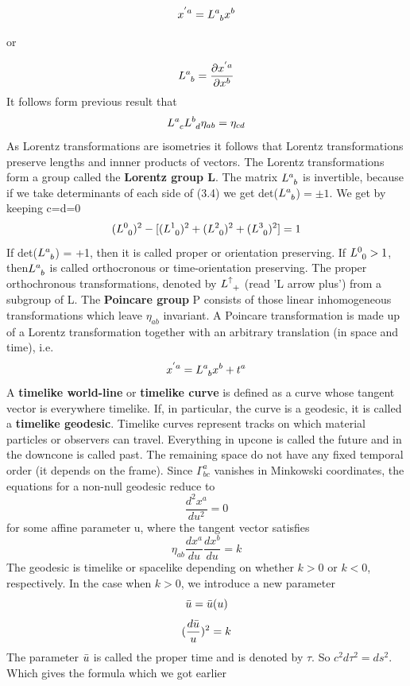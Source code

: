 \documentclass[12pt,a4paper]{article}
\numberwithin{table}{section}
\numberwithin{figure}{section}
\numberwithin{equation}{section}
\theoremstyle{remark}
\theoremstyle{definition}
\begin{document}
\begin{equation}
    x^{'a}=\tensor{L}{^a_b}x^b
\end{equation}

or

$$\tensor{L}{^a_b}=\dfrac{\partial x^{'a}}{\partial x^b} $$
It follows form previous result that
\begin{equation}
  \tensor{L}{^a_c}\tensor{L}{^b_d}\eta_{ab}=\eta_{cd}  
\end{equation}
As Lorentz transformations are isometries it follows that Lorentz 
transformations preserve lengths and innner products of vectors. The Lorentz 
transformations form a group called the \textbf{Lorentz group L}.
The matrix $\tensor{L}{^a_b}$ is invertible, because if we take determinants of each side of (3.4) we get det($\tensor{L}{^a_b} $)$=\pm1$. We get by keeping c=d=0
$$(\tensor{L}{^0_0})^2-[(\tensor{L}{^1_0})^2+(\tensor{L}{^2_0})^2+(\tensor{L}{^3_0})^2]=1 $$
If det($\tensor{L}{^a_b}$) = +1, then it is called proper or orientation preserving.
If $\tensor{L}{^0_0} > 1$, then$\tensor{L}{^a_b} $ is called orthocronous or 
time-orientation preserving.
The proper orthochronous transformations, denoted by $\tensor{L}{^\uparrow_+}$ (read 'L arrow plus') from a subgroup of L.
The \textbf{Poincare group} P consists of those linear inhomogeneous  
transformations which leave $\eta_{ab}$ invariant. A Poincare transformation is made up of a Lorentz transformation together with an arbitrary translation (in space and time), i.e.
$$x^{'a}=\tensor{L}{^a_b}x^b+t^a $$
A \textbf{timelike world-line} or \textbf{timelike curve} is defined as a curve whose tangent vector is everywhere timelike. If, in particular, the curve is a geodesic, it is called a \textbf{timelike geodesic}. Timelike curves represent tracks on which material particles or observers can travel. Everything in upcone is called the future and in the downcone is called past. The remaining space do not have any fixed temporal order (it depends on the frame).
Since $\Gamma^a_{bc}$ vanishes in Minkowski coordinates, the equations for a non-null geodesic reduce to
\begin{equation}
    \dfrac{d^2x^a}{du^2}=0
\end{equation}
for some affine parameter u, where the tangent vector satisfies 
$$\eta_{ab}\dfrac{dx^a}{du}\dfrac{dx^b}{du}=k $$
The geodesic is timelike or spacelike depending on whether $k>0$ or $k<0$, 
respectively. In the case when $k>0$, we introduce a new parameter 
$$\Bar{u}=\Bar{u}(u) $$
$$(\dfrac{d\Bar{u}}{u})^2=k$$
The parameter $\Bar{u}$ is called the proper time and is denoted by $\tau$. So $c^2d\tau^2=ds^2$. Which gives the formula which we got earlier
\end{document}
